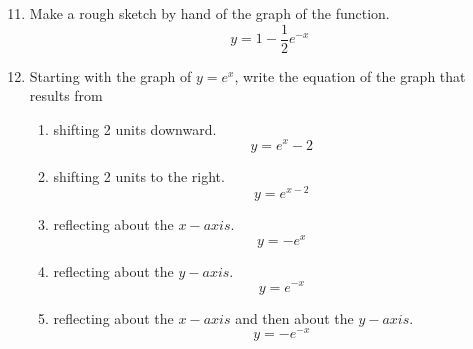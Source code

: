 \documentclass[12pt]{article}
\begin{document}
\begin{enumerate}
\setcounter{enumi}{10}
        \item Make a rough sketch by hand of the graph of the function.
        \[y = 1 - \frac{1}{2}e^{-x}\]
        \begin{center}
        \end{center}

\setcounter{enumi}{12}
        \item Starting with the graph of $y = e^x$, write the equation of the graph that results from
        \begin{enumerate}
            \item shifting 2 units downward.
            \[y = e^x - 2\]
            \item shifting 2 units to the right.
            \[y = e^{x-2}\]
            \item reflecting about the $x-axis$.
            \[y = -e^{x}\]
            \item reflecting about the $y-axis$.
            \[y = e^{-x}\]
            \item reflecting about the $x-axis$ and then about the $y-axis$.
            \[y = -e^{-x}\]
        \end{enumerate}


\end{enumerate}
\end{document}
